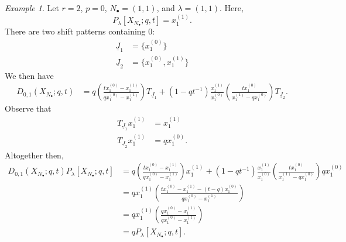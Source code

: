 \documentclass{amsart}
\newcommand{\Ju}{{\underline{J}}}
\theoremstyle{remark}
\newtheorem{ex}[thm]{Example}
\numberwithin{thm}{section}
\numberwithin{equation}{section}
\begin{document}
\begin{ex}
Let $r=2$, $p=0$, $N_\bullet=(1,1)$, and $\lambda=(1,1)$.
Here, 
\[P_\lambda[X_{N_\bullet};q,t]=x_1^{(1)}.\]
There are two shift patterns containing $0$:
\begin{align*}
    \Ju_1&=\{x_1^{(0)}\}\\
    \Ju_2&=\{x_1^{(0)},x_1^{(1)}\}
\end{align*}
We then have
\begin{align*}
    D_{0,1}(X_{N_\bullet};q,t)&=
    q\left(
   \frac{tx_1^{(0)}-x_1^{(1)}}{qx_1^{(0)}-x_1^{(1)}} 
    \right)T_{\Ju_1}
    +(1-qt^{-1})
    \frac{x_1^{(1)}}{x_1^{(0)}}
    \left(
    \frac{tx_1^{(0)}}{x_1^{(1)}-qx_1^{(0)}}
    \right)T_{\Ju_2}.
\end{align*}
Observe that
\begin{align*}
    T_{\Ju_1}x_1^{(1)}&=x_1^{(1)}\\
    T_{\Ju_2}x_1^{(1)}&=qx_1^{(0)}.
\end{align*}
Altogether then,
\begin{align*}
    D_{0,1}(X_{N_\bullet};q,t)P_\lambda[X_{N_\bullet};q,t]
    &=q\left(
   \frac{tx_1^{(0)}-x_1^{(1)}}{qx_1^{(0)}-x_1^{(1)}} 
    \right)x_1^{(1)}
    +(1-qt^{-1})
    \frac{x_1^{(1)}}{x_1^{(0)}}
    \left(
    \frac{tx_1^{(0)}}{x_1^{(1)}-qx_1^{(0)}}
    \right)qx_1^{(0)}\\
    &=qx_1^{(1)}\left(\frac{tx_1^{(0)}-x_1^{(1)}-(t-q)x_1^{(0)}}{qx_1^{(0)}-x_1^{(1)}}\right)\\
    &=qx_1^{(1)}\left(\frac{qx_1^{(0)}-x_1^{(1)}}{qx_1^{(0)}-x_1^{(1)}}\right)\\
    &=qP_\lambda[X_{N_\bullet};q,t].
\end{align*}
\end{ex}
\end{document}
